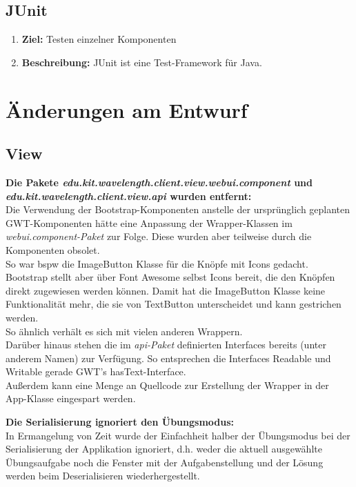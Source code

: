 \documentclass[parskip=full,11pt,twoside]{scrartcl}
\begin{document}
\subsection{JUnit}
\begin{enumerate}
\item[] \textbf{Ziel:} Testen einzelner Komponenten
\item[] \textbf{Beschreibung:} JUnit ist eine Test-Framework für Java.
\end{enumerate}

\section{Änderungen am Entwurf}

\subsection{View}
\textbf{Die Pakete \emph{edu.kit.wavelength.client.view.webui.component} und \emph{edu.kit.wavelength.client.view.api} wurden entfernt:} \\
Die Verwendung der Bootstrap-Komponenten anstelle der ursprünglich geplanten GWT-Komponenten hätte eine Anpassung der Wrapper-Klassen im \emph{webui.component-Paket} zur Folge.
Diese wurden aber teilweise durch die Komponenten obsolet. \\
So war bspw die ImageButton Klasse für die Knöpfe mit Icons gedacht.
Bootstrap stellt aber über Font Awesome selbst Icons bereit, die den Knöpfen direkt zugewiesen werden können.
Damit hat die ImageButton Klasse keine Funktionalität mehr, die sie von TextButton unterscheidet und kann gestrichen werden. \\
So ähnlich verhält es sich mit vielen anderen Wrappern.\\
Darüber hinaus stehen die im \emph{api-Paket} definierten Interfaces bereits (unter anderem Namen) zur Verfügung.
So entsprechen die Interfaces Readable und Writable gerade GWT's hasText-Interface.\\	
Außerdem kann eine Menge an Quellcode zur Erstellung der Wrapper in der App-Klasse eingespart werden.

\textbf{Die Serialisierung ignoriert den Übungsmodus:} \\
In Ermangelung von Zeit wurde der Einfachheit halber der Übungsmodus bei der Serialisierung der Applikation ignoriert, d.h. 
 weder die aktuell ausgewählte Übungsaufgabe noch die Fenster mit der Aufgabenstellung und der Lösung werden beim 
 Deserialisieren wiederhergestellt.
 
\end{document}
